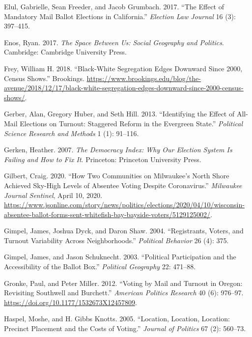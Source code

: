 \documentclass[
  12pt,
]{article}
\newlength{\cslhangindent}
\newenvironment{cslreferences}%
  {\setlength{\parindent}{0pt}%
  \everypar{\setlength{\hangindent}{\cslhangindent}}\ignorespaces}%
  {\par}
\begin{document}
\begin{cslreferences}
\leavevmode\hypertarget{ref-Elul2017}{}%
Elul, Gabrielle, Sean Freeder, and Jacob Grumbach. 2017. ``The Effect of Mandatory Mail Ballot Elections in California.'' \emph{Election Law Journal} 16 (3): 397--415.

\leavevmode\hypertarget{ref-Enos2017}{}%
Enos, Ryan. 2017. \emph{The Space Between Us: Social Geography and Politics}. Cambridge: Cambridge University Press.

\leavevmode\hypertarget{ref-Frey2018}{}%
Frey, William H. 2018. ``Black-White Segregation Edges Downward Since 2000, Census Shows.'' Brookings. \url{https://www.brookings.edu/blog/the-avenue/2018/12/17/black-white-segregation-edges-downward-since-2000-census-shows/}.

\leavevmode\hypertarget{ref-Gerber2013}{}%
Gerber, Alan, Gregory Huber, and Seth Hill. 2013. ``Identifying the Effect of All-Mail Elections on Turnout: Staggered Reform in the Evergreen State.'' \emph{Political Science Research and Methods} 1 (1): 91--116.

\leavevmode\hypertarget{ref-Gerken2007}{}%
Gerken, Heather. 2007. \emph{The Democracy Index: Why Our Election System Is Failing and How to Fix It}. Princeton: Princeton University Press.

\leavevmode\hypertarget{ref-Gilbert2020}{}%
Gilbert, Craig. 2020. ``How Two Communities on Milwaukee's North Shore Achieved Sky-High Levels of Absentee Voting Despite Coronavirus.'' \emph{Milwaukee Journal Sentinel}, April 10, 2020. \url{https://www.jsonline.com/story/news/politics/elections/2020/04/10/wisconsin-absentee-ballot-forms-sent-whitefish-bay-bayside-voters/5129125002/}.

\leavevmode\hypertarget{ref-Gimpel2004}{}%
Gimpel, James, Joshua Dyck, and Daron Shaw. 2004. ``Registrants, Voters, and Turnout Variability Across Neighborhoods.'' \emph{Political Behavior} 26 (4): 375.

\leavevmode\hypertarget{ref-Gimpel2003}{}%
Gimpel, James, and Jason Schuknecht. 2003. ``Political Participation and the Accessibility of the Ballot Box.'' \emph{Political Geography} 22: 471--88.

\leavevmode\hypertarget{ref-Gronke2012}{}%
Gronke, Paul, and Peter Miller. 2012. ``Voting by Mail and Turnout in Oregon: Revisiting Southwell and Burchett.'' \emph{American Politics Research} 40 (6): 976--97. \url{https://doi.org/10.1177/1532673X12457809}.

\leavevmode\hypertarget{ref-Haspel2005}{}%
Haspel, Moshe, and H. Gibbs Knotts. 2005. ``Location, Location, Location: Precinct Placement and the Costs of Voting.'' \emph{Journal of Politics} 67 (2): 560--73.


\end{cslreferences}
\end{document}
